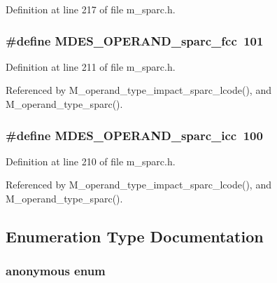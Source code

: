 Definition at line 217 of file m\_\-sparc.h.
\subsubsection{\setlength{\rightskip}{0pt plus 5cm}\#define MDES\_\-OPERAND\_\-sparc\_\-fcc~101}\label{m__sparc_8h_853f7af96ff136636623c991a9f03935}




Definition at line 211 of file m\_\-sparc.h.

Referenced by M\_\-operand\_\-type\_\-impact\_\-sparc\_\-lcode(), and M\_\-operand\_\-type\_\-sparc().
\subsubsection{\setlength{\rightskip}{0pt plus 5cm}\#define MDES\_\-OPERAND\_\-sparc\_\-icc~100}\label{m__sparc_8h_c7127ec24f1695933423e9ecb369ec3e}




Definition at line 210 of file m\_\-sparc.h.

Referenced by M\_\-operand\_\-type\_\-impact\_\-sparc\_\-lcode(), and M\_\-operand\_\-type\_\-sparc().

\subsection{Enumeration Type Documentation}
\subsubsection{\setlength{\rightskip}{0pt plus 5cm}anonymous enum}\label{m__sparc_8h_bc5c98fcc1211af2b80116dd6e0a035d}


